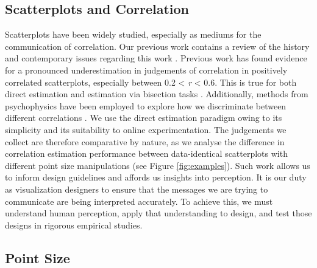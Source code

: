 \documentclass{vgtc}                          %
\begin{document}
\hypertarget{scatterplots-and-correlation}{%
\subsection{Scatterplots and Correlation}\label{scatterplots-and-correlation}}

Scatterplots have been widely studied, especially as mediums for the communication
of correlation. Our previous work contains a review of the history and contemporary
issues regarding this work \cite{strain_2023}. Previous work has found evidence for a
pronounced underestimation in judgements of correlation in positively correlated
scatterplots, especially between 0.2 \textless{} \emph{r} \textless{} 0.6. This
is true for both direct estimation \cite{meyer_1992, collyer_1990} and estimation
via bisection tasks \cite{rensink_2017}. Additionally, methods from psychophysics
have been employed to explore how we discriminate between different correlations
\cite{rensink_2014, rensink_2017}. We use the direct estimation paradigm owing to its simplicity and its suitability
to online experimentation. The judgements we collect are therefore
comparative by nature, as we analyse the difference in correlation estimation performance
between data-identical scatterplots with different point size manipulations (see Figure \ref{fig:examples}).
Such work allows us to inform design guidelines and affords us insights into perception.
It is our duty as visualization designers to ensure that the
messages we are trying to communicate are being interpreted accurately.
To achieve this, we must understand human perception, apply that understanding
to design, and test those designs in rigorous empirical studies.

\hypertarget{point-size}{%
\subsection{Point Size}\label{point-size}}
\end{document}
